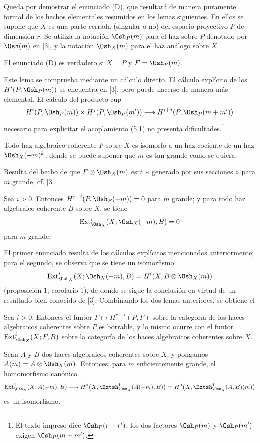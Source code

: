 Queda por demostrar el enunciado (D), que resultará de manera puramente formal de los hechos
elementales resumidos en los lemas siguientes. En ellos se supone que $X$ es una
parte cerrada (singular o no) del espacio proyectivo $P$ de dimensión $r$.
Se utiliza la notación $\Osh_P(m)$ para el haz sobre $P$ denotado por $\Osh(m)$ en
[3], y la notación $\Osh_X(m)$ para el haz análogo sobre $X$.

 El enunciado (D) es verdadero si $X=P$ y $F=\Osh_P(m)$.

Este lema se comprueba mediante un cálculo directo. El cálculo explícito de los
$H^{i}(P,\Osh_P(m))$ se encuentra en [3], pero puede hacerse de manera más
elemental. El cálculo del producto cup
\[
  H^{i}(P,\Osh_P(m))\times H^{j}(P,\Osh_P(m'))
  \longrightarrow H^{i+j}(P,\Osh_P(m+m'))
\]
necesario para explicitar el acoplamiento (5.1) no presenta
dificultades.\footnote{El texto impreso dice $\Osh_P(r+r')$; los dos factores
$\Osh_P(m)$ y $\Osh_P(m')$ exigen $\Osh_P(m+m')$.}

 Todo haz algebraico coherente $F$ sobre $X$ es isomorfo a
un haz cociente de un haz $\Osh_X(-m)^{k}$, donde se puede suponer que $m$ es
tan grande como se quiera.

Resulta del hecho de que $F\otimes\Osh_X(m)$ está « generado por sus secciones » para
$m$ grande, cf. [3].

 Sea $i>0$. Entonces
$H^{r-i}(P,\Osh_P(-m))=0$ para $m$ grande; y para todo haz algebraico
coherente $B$ sobre $X$, se tiene
\[
  \operatorname{Ext}_{\Osh_X}^{i}(X;\Osh_X(-m),B)=0
\]
para $m$ grande.

El primer enunciado resulta de los cálculos explícitos mencionados anteriormente; para el
segundo, se observa que se tiene un isomorfismo
\[
  \operatorname{Ext}_{\Osh_X}^{i}(X;\Osh_X(-m),B)
  =H^{i}(X,B\otimes\Osh_X(m))
\]
(proposición 1, corolario 1), de donde se sigue la conclusión en virtud de un resultado bien
conocido de [3]. Combinando los dos lemas anteriores, se obtiene el

 Sea $i>0$. Entonces el funtor
$F\longmapsto H^{r-i}(P,F)$ sobre la categoría de los haces algebraicos coherentes
sobre $P$ es borrable, y lo mismo ocurre con el funtor
$\operatorname{Ext}_{\Osh_X}^{i}(X;F,B)$ sobre la categoría de los haces
algebraicos coherentes sobre $X$.

 Sean $A$ y $B$ dos haces algebraicos coherentes sobre
$X$, y pongamos $A(m)=A\otimes\Osh_X(m)$. Entonces, para $m$ suficientemente grande,
el homomorfismo canónico
\[
  \operatorname{Ext}_{\Osh_X}^{1}(X;A(-m),B)
  \longrightarrow H^{0}\bigl(X,\Extsh_{\Osh_X}^{1}(A(-m),B)\bigr)
  =H^{0}\bigl(X,\Extsh_{\Osh_X}^{1}(A,B)(m)\bigr)
\]
es un isomorfismo.

